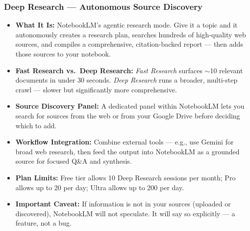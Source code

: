 \begin{frame}[fragile]\frametitle{Deep Research — Autonomous Source Discovery}
  \begin{itemize}
    \item \textbf{What It Is:} NotebookLM's agentic research mode. Give it a topic and it autonomously creates a research plan, searches hundreds of high-quality web sources, and compiles a comprehensive, citation-backed report — then adds those sources to your notebook.
    \item \textbf{Fast Research vs.\ Deep Research:} \textit{Fast Research} surfaces $\sim$10 relevant documents in under 30 seconds. \textit{Deep Research} runs a broader, multi-step crawl — slower but significantly more comprehensive.
    \item \textbf{Source Discovery Panel:} A dedicated panel within NotebookLM lets you search for sources from the web or from your Google Drive before deciding which to add.
    \item \textbf{Workflow Integration:} Combine external tools — e.g., use Gemini for broad web research, then feed the output into NotebookLM as a grounded source for focused Q\&A and synthesis.
    \item \textbf{Plan Limits:} Free tier allows 10 Deep Research sessions per month; Pro allows up to 20 per day; Ultra allows up to 200 per day.
    \item \textbf{Important Caveat:} If information is not in your sources (uploaded or discovered), NotebookLM will not speculate. It will say so explicitly — a feature, not a bug.
  \end{itemize}
\end{frame}

